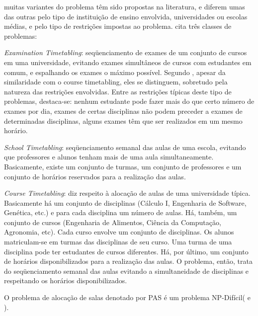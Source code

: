 


\cite{souza2000} muitas variantes do problema têm sido propostas na literatura, e diferem umas das outras pelo tipo de instituição de ensino envolvida, universidades ou escolas médias, e pelo tipo de restrições impostas ao problema. \cite{schaerf1999survey} cita três classes de problemas:


\textit{Examination Timetabling}: seqüenciamento de exames de um conjunto de cursos em uma universidade, evitando exames simultâneos de cursos com estudantes em comum, e espalhando os exames o máximo possível. Segundo \cite{souza2000}, apesar da similaridade com o course timetabling, eles se distinguem, sobretudo pela natureza das restrições envolvidas. Entre as restrições típicas deste tipo de problemas, destaca-se: nenhum estudante pode fazer mais do que certo número de exames por dia, exames de certas disciplinas não podem preceder a exames de determinadas disciplinas, alguns exames têm que ser realizados em um mesmo horário.\par

\textit{School Timetabling}: seqüenciamento semanal das aulas de uma escola, evitando que professores e alunos tenham mais de uma aula simultaneamente. Basicamente, existe um conjunto de turmas, um conjunto de professores e um conjunto de horários reservados para a realização das aulas.\par

\textit{Course Timetabling}: diz respeito à alocação de aulas de uma universidade típica. Basicamente há um conjunto de disciplinas (Cálculo I, Engenharia de Software, Genética, etc.) e para cada disciplina um número de aulas. Há, também, um conjunto de cursos (Engenharia de Alimentos, Ciência da Computação, Agronomia, etc). Cada curso envolve um conjunto de disciplinas. Os alunos matriculam-se em turmas das disciplinas de seu curso. Uma turma de uma disciplina pode ter estudantes de cursos diferentes. Há, por último, um conjunto de horários disponibilizados para a realização das aulas. O problema, então, trata do seqüenciamento semanal das aulas evitando a simultaneidade de disciplinas e respeitando os horários disponibilizados.\par


O problema de alocação de salas denotado por PAS é um problema NP-Difícil(\cite{even1975complexity} e \cite{carter1992classroom}).\par

